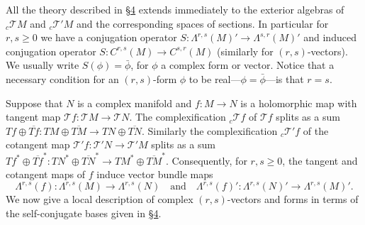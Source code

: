 All the theory described in \hyperref[sec:5:4]{\S4} extends immediately to the exterior algebras of ${}_c\mathcal TM$ and ${}_c\mathcal T'M$ and the corresponding spaces of sections. In particular for $r,s\geq0$ we have a conjugation operator $S:\Lambda^{r,s}(M)'\to\Lambda^{s,r}(M)'$ and induced conjugation operator $S:C^{r,s}(M)\to C^{s,r}(M)$ (similarly for $(r,s)$-vectors). We usually write $S(\phi)=\bar\phi$, for $\phi$ a complex form or vector. Notice that a necessary condition for an $(r,s)$-form $\phi$ to be real---$\phi=\bar\phi$---is that $r=s$.

Suppose that $N$ is a complex manifold and $f:M\to N$ is a holomorphic map with tangent map $\mathcal Tf:\mathcal TM\to\mathcal TN$. The complexification ${}_c\mathcal Tf$ of $\mathcal Tf$ splits as a sum $Tf\oplus\overline{Tf}:TM\oplus\overline{TM}\to TN\oplus\overline{TN}$. Similarly the complexification ${}_c\mathcal T'f$ of the cotangent map $\mathcal T'f:\mathcal T'N\to\mathcal T'M$ splits as a sum $Tf^*\oplus\overline{Tf}^*:TN^*\oplus\overline{TN}^*\to TM^*\oplus\overline{TM}^*$. Consequently, for $r,s\geq0$, the tangent and cotangent maps of $f$ induce vector bundle maps
\[\Lambda^{r,s}(f):\Lambda^{r,s}(M)\to\Lambda^{r,s}(N)\quad\text{and}\quad\Lambda^{r,s}(f)':\Lambda^{r,s}(N)'\to\Lambda^{r,s}(M)'.\]
We now give a local description of complex $(r,s)$-vectors and forms in terms of the self-conjugate bases given in \hyperref[sec:5:4]{\S4}.

